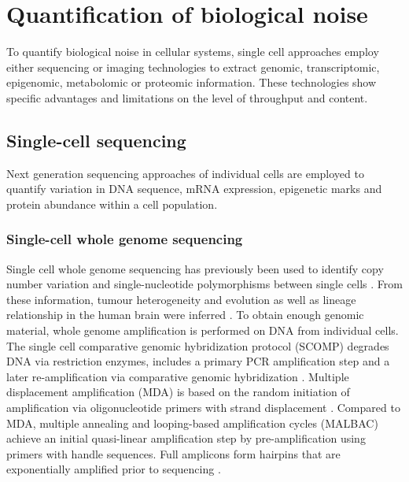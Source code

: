 
\section{Quantification of biological noise} 

To quantify biological noise in cellular systems, single cell approaches employ either sequencing or imaging technologies to extract genomic, transcriptomic, epigenomic, metabolomic or proteomic information. These technologies show specific advantages and limitations on the level of throughput and content.

\subsection{Single-cell sequencing}

Next generation sequencing approaches of individual cells are employed to quantify variation in DNA sequence, mRNA expression, epigenetic marks and protein abundance within a cell population. 

\subsubsection{Single-cell whole genome sequencing}

Single cell whole genome sequencing has previously been used to identify copy number variation and single-nucleotide polymorphisms between single cells \citep{Shpunt2012}. From these information, tumour heterogeneity and evolution \citep{Navin2011} as well as lineage relationship in the human brain were inferred \citep{Evrony2015}. To obtain enough genomic material, whole genome amplification is performed on DNA from individual cells. The single cell comparative genomic hybridization protocol (SCOMP) degrades DNA via restriction enzymes, includes a primary PCR amplification step and a later re-amplification via comparative genomic hybridization \citep{Klein1999}. Multiple displacement amplification (MDA) is based on the random initiation of amplification via oligonucleotide primers with strand displacement \citep{Dean2002}. Compared to MDA, multiple annealing and looping-based amplification cycles (MALBAC) achieve an initial quasi-linear amplification step by pre-amplification using primers with handle sequences. Full amplicons form hairpins that are exponentially amplified prior to sequencing \citep{Shpunt2012}. 

